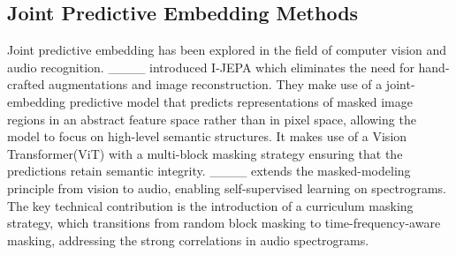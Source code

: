\subsection{Joint Predictive Embedding Methods}
Joint predictive embedding has been explored in the field of computer vision and audio recognition. ____ introduced I-JEPA which eliminates the need for hand-crafted augmentations and image reconstruction. They make use of a joint-embedding predictive model that predicts representations of masked image regions in an abstract feature space rather than in pixel space, allowing the model to focus on high-level semantic structures. It makes use of a Vision Transformer(ViT) with a multi-block masking strategy ensuring that the predictions retain semantic integrity. ____  extends the masked-modeling principle from vision to audio, enabling self-supervised learning on spectrograms. The key technical contribution is the introduction of a curriculum masking strategy, which transitions from random block masking to time-frequency-aware masking, addressing the strong correlations in audio spectrograms.